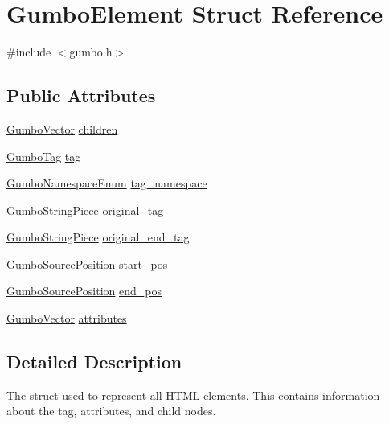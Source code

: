 \hypertarget{struct_gumbo_element}{}\section{Gumbo\+Element Struct Reference}
\label{struct_gumbo_element}


{\ttfamily \#include $<$gumbo.\+h$>$}

\subsection*{Public Attributes}
\begin{DoxyCompactItemize}
\item 
\mbox{\hyperlink{struct_gumbo_vector}{Gumbo\+Vector}} \mbox{\hyperlink{struct_gumbo_element_ade0a04bb1508bb2419958b582710b89b}{children}}
\item 
\mbox{\hyperlink{gumbo_8h_a5a3aa6f4b039f85875d638088e676a0f}{Gumbo\+Tag}} \mbox{\hyperlink{struct_gumbo_element_ac7d72e040dc6c261e5c31d65c0fee52f}{tag}}
\item 
\mbox{\hyperlink{gumbo_8h_a5792dfd02513e421fb8f083f08e58cc6}{Gumbo\+Namespace\+Enum}} \mbox{\hyperlink{struct_gumbo_element_a6c01efba44e5efdef53a68d628d6e6fc}{tag\+\_\+namespace}}
\item 
\mbox{\hyperlink{struct_gumbo_string_piece}{Gumbo\+String\+Piece}} \mbox{\hyperlink{struct_gumbo_element_af1c8a0e4a16b5d76c55c4b2f20fe740c}{original\+\_\+tag}}
\item 
\mbox{\hyperlink{struct_gumbo_string_piece}{Gumbo\+String\+Piece}} \mbox{\hyperlink{struct_gumbo_element_a3f23be395bd8c824cedc3f01be1c897b}{original\+\_\+end\+\_\+tag}}
\item 
\mbox{\hyperlink{struct_gumbo_source_position}{Gumbo\+Source\+Position}} \mbox{\hyperlink{struct_gumbo_element_a9ac8a1a688c2dfa3e8988a6f0a7aa007}{start\+\_\+pos}}
\item 
\mbox{\hyperlink{struct_gumbo_source_position}{Gumbo\+Source\+Position}} \mbox{\hyperlink{struct_gumbo_element_af96c28798bcd9c0ac05a93eb4abeffef}{end\+\_\+pos}}
\item 
\mbox{\hyperlink{struct_gumbo_vector}{Gumbo\+Vector}} \mbox{\hyperlink{struct_gumbo_element_aab2e879f3ee064cc075a8ffc83cdcfb2}{attributes}}
\end{DoxyCompactItemize}


\subsection{Detailed Description}
The struct used to represent all H\+T\+ML elements. This contains information about the tag, attributes, and child nodes. 

